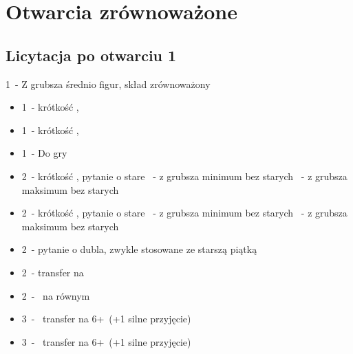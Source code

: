 \documentclass[12pt, a4paper]{article}
\begin{document}
\pagebreak
\section{Otwarcia zrównoważone}
\subsection{Licytacja po otwarciu 1\diams}
\begin{formal}
    1\diams\ - Z grubsza średnio figur, skład zrównoważony
\end{formal}
\begin{itemize}
    \item 1\hearts\ - krótkość \hearts, \fonce
    \item 1\spades\ - krótkość \spades, \fonce
    \item 1\nt\ - Do gry
    \item 2\clubs\ - krótkość \clubs, pytanie o stare
    \diams\ - z grubsza minimum bez starych
    \nt\ - z grubsza maksimum bez starych
    \item 2\diams\ - krótkość \diams, pytanie o stare
    \nt\ - z grubsza minimum bez starych
    \clubs\ - z grubsza maksimum bez starych
    \item 2\hearts\ - pytanie o dubla, zwykle stosowane ze starszą piątką
    \item 2\spades\ - transfer na \nt
    \item 2\nt\ - \gf\ na równym
    \item 3\clubs\ - \gf\ transfer na 6+\hearts\ (+1 silne przyjęcie)
    \item 3\diams\ - \gf\ transfer na 6+\spades\ (+1 silne przyjęcie)
\end{itemize}

\pagebreak
\end{document}
